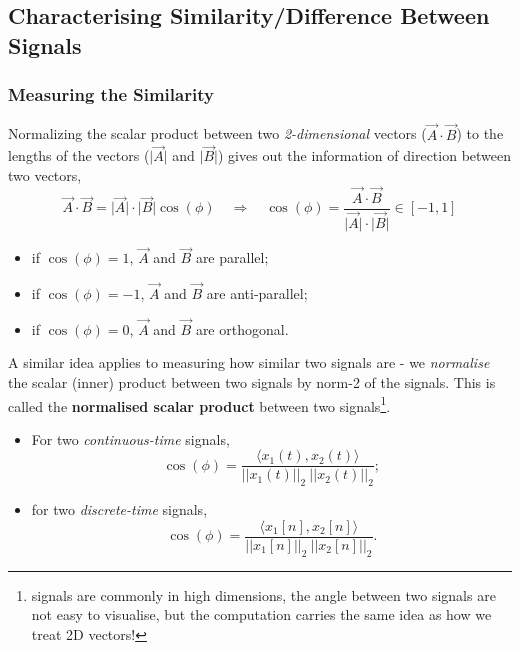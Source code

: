 \subsection{Characterising Similarity/Difference Between Signals}
\subsubsection{Measuring the Similarity}
Normalizing the scalar product between two \textit{2-dimensional} vectors ($\vec{A} \cdot \vec{B}$) to the lengths of the vectors ($\lvert \vec{A} \rvert$ and $\lvert \vec{B} \rvert$) gives out the information of direction between two vectors,
\[
    \vec{A} \cdot \vec{B} =\lvert \vec{A} \rvert \cdot \lvert \vec{B} \rvert \cos(\phi)
    \quad \Rightarrow \quad 
    \cos(\phi) = \frac{\vec{A} \cdot \vec{B}}{\lvert \vec{A} \rvert \cdot \lvert \vec{B} \rvert}
    \in [-1, 1]
\]
\begin{itemize}
    \item if $\cos(\phi) = 1$, $\vec{A}$ and $\vec{B}$ are parallel;
    \item if $\cos(\phi) = -1$, $\vec{A}$ and $\vec{B}$ are anti-parallel;
    \item if $\cos(\phi) = 0$, $\vec{A}$ and $\vec{B}$ are orthogonal.
\end{itemize}
A similar idea applies to measuring how similar two signals are - we \textit{normalise} the scalar (inner) product between two signals by norm-2 of the signals. This is called the \textbf{normalised scalar product} between two signals\footnote{signals are commonly in high dimensions, the angle between two signals are not easy to visualise, but the computation carries the same idea as how we treat 2D vectors!}.

\begin{itemize}
    \item For two \textit{continuous-time} signals,
    \[
        \cos(\phi) = \frac{\langle x_{1}(t), x_{2}(t) \rangle}{ \lvert \lvert x_{1}(t) \rvert \rvert_{2} \ \lvert \lvert x_{2}(t) \rvert \rvert_{2}};
    \]
    
    \item for two \textit{discrete-time} signals,
    \[
        \cos(\phi) = \frac{\langle x_{1}[n], x_{2}[n] \rangle}{ \lvert \lvert x_{1}[n] \rvert \rvert_{2} \ \lvert \lvert x_{2}[n] \rvert \rvert_{2}}.
    \]
\end{itemize}


